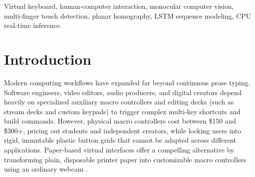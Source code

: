 \documentclass[conference]{IEEEtran}
\begin{document}
\begin{IEEEkeywords}
Virtual keyboard, human-computer interaction, monocular computer vision, multi-finger touch detection, planar homography, LSTM sequence modeling, CPU real-time inference.
\end{IEEEkeywords}

\section{Introduction}
\label{sec:intro}
Modern computing workflows have expanded far beyond continuous prose typing. Software engineers, video editors, audio producers, and digital creators depend heavily on specialized auxiliary macro controllers and editing decks (such as stream decks and custom keypads) to trigger complex multi-key shortcuts and build commands. However, physical macro controllers cost between \$150 and \$300+, pricing out students and independent creators, while locking users into rigid, immutable plastic button grids that cannot be adapted across different applications. Paper-based virtual interfaces offer a compelling alternative by transforming plain, disposable printer paper into customizable macro controllers using an ordinary webcam \cite{Boletsis2019TextInput, ReviewVirtualKeyboard2020, Zhang2001Visual, Srivastava2012RealTime, Khare2019QWERTY}.
\end{document}
